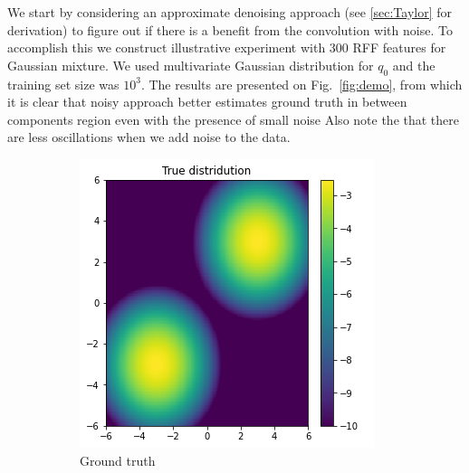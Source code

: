 We start by considering an approximate denoising approach (see \ref{sec:Taylor} for derivation)
to figure out if there is a benefit from the convolution with noise.
To accomplish this we construct illustrative experiment with $300$ RFF
features for Gaussian mixture.
We used multivariate Gaussian distribution for $q_0$
and the training set size was $10^3$.
The results are presented on Fig.~\ref{fig:demo},
from which it is clear that noisy approach better estimates ground truth in between components
region even with the presence of small noise
Also note the that there are less oscillations when we add noise to the data.
\begin{figure}[!ht]
  \centering
  \begin{subfigure}[b]{0.32\textwidth}
    \includegraphics[width=\textwidth]{figures/score_matching/exps/taylor_MoG_true.png}
    \captionsetup{justification=centering}
    \caption{Ground truth\\ \hfill}
    \label{sfig:MoGtrue}
  \end{subfigure}
  \begin{subfigure}[b]{0.32\textwidth}

\end{subfigure}
\end{figure}
